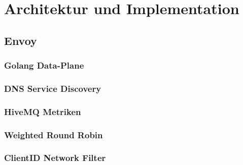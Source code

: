 \section{Architektur und Implementation}

\subsection{Envoy}
\subsubsection{Golang Data-Plane}
\subsubsection{DNS Service Discovery}
\subsubsection{HiveMQ Metriken}
\subsubsection{Weighted Round Robin}
\subsubsection{ClientID Network Filter}

